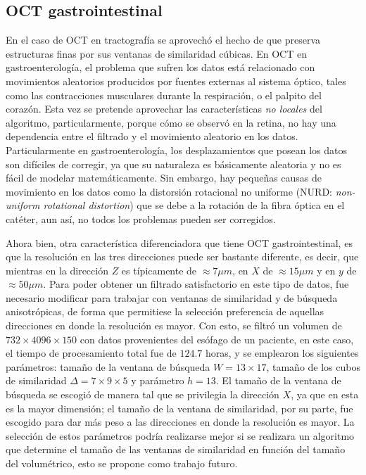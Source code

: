 \subsection{OCT gastrointestinal}

En el caso de OCT en tractografía se aprovechó el hecho de que \nlmeansOCT preserva estructuras finas por sus ventanas de similaridad cúbicas. En OCT en gastroenterología, el problema que sufren los datos está relacionado con movimientos aleatorios producidos por fuentes externas al sistema óptico, tales como las contracciones musculares durante la respiración, o el palpito del corazón. Esta vez se pretende aprovechar las características \emph{no locales} del algoritmo, particularmente, porque cómo se observó en la retina, no hay una dependencia entre el filtrado y el movimiento aleatorio en los datos. Particularmente en gastroenterología, los desplazamientos que posean los datos son difíciles de corregir, ya que su naturaleza es básicamente aleatoria y no es fácil de modelar matemáticamente. Sin embargo, hay pequeñas causas de movimiento en los datos como la distorsión rotacional no uniforme (NURD: \textit{non-uniform rotational distortion}) \cite{Uribe2015} que se debe a la rotación de la fibra óptica en el catéter, aun así, no todos los problemas pueden ser corregidos.

Ahora bien, otra característica diferenciadora que tiene OCT gastrointestinal, es que la resolución en las tres direcciones puede ser bastante diferente, es decir, que mientras en la dirección $Z$ es típicamente de $\approx 7\mu m$, en $X$ de $\approx15\mu m$ y en $y$ de $\approx50\mu m$. Para poder obtener un filtrado satisfactorio en este tipo de datos, fue necesario modificar \nlmeansOCT para trabajar con ventanas de similaridad y de búsqueda anisotrópicas, de forma que permitiese la selección preferencia de aquellas direcciones en donde la resolución es mayor. Con esto, se filtró un volumen de $732\times4096\times150$ con datos provenientes del esófago de un paciente, en este caso, el tiempo de procesamiento total fue de $124.7$ horas, y se emplearon los siguientes parámetros: tamaño de la ventana de búsqueda $W = 13\times17$, tamaño de los cubos de similaridad $\Delta=7\times9\times5$ y parámetro $h=13$. El tamaño de la ventana de búsqueda se escogió de manera tal que se privilegia la dirección $X$, ya que en esta es la mayor dimensión; el tamaño de la ventana de similaridad, por su parte, fue escogido para dar más peso a las direcciones en donde la resolución es mayor. La selección de estos parámetros podría realizarse mejor si se realizara un algoritmo que determine el tamaño de las ventanas de similaridad en función del tamaño del \speckle volumétrico, esto se propone como trabajo futuro.

